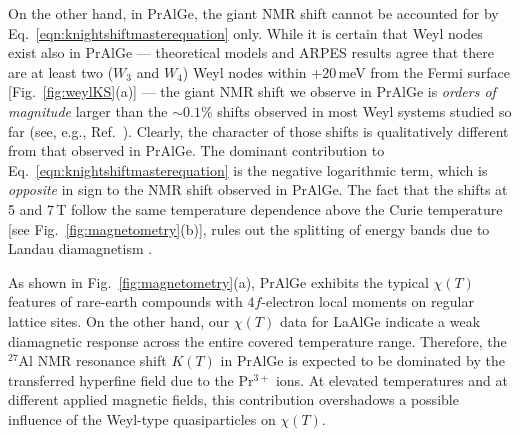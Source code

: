 \documentclass[aps,prb,a4paper,10pt,twocolumn,showpacs,floatfix,superscriptaddress,preprintnumbers,longbibliography]{revtex4-2}
\newcommand{\tcb}[1]{\textcolor{blue}{#1}}
\begin{document}

On the other hand, in PrAlGe, the giant NMR shift cannot be accounted for by Eq.~\eqref{eqn:knightshiftmasterequation} only. 
While it is certain that Weyl nodes exist also in PrAlGe --- theoretical models \cite{chang2018magnetic} and ARPES results %
\cite{sanchez2020observation} agree that there are at least two ($W_3$ and $W_4$) Weyl nodes within +20\,meV from the Fermi surface [Fig.~\ref{fig:weylKS}(a)] ---
the giant NMR shift we observe in PrAlGe is \emph{orders of magnitude}
larger than the $\sim 0.1\%$ shifts observed in most Weyl systems studied
so far (see, e.g., Ref.~\cite{antonenko2019nmr,Okvtovity2019nuclear,Wang2020landau}).
Clearly, the character of those shifts is qualitatively
different from that observed in PrAlGe. %
The dominant contribution to Eq.~\eqref{eqn:knightshiftmasterequation}
is the negative logarithmic term, which is \emph{opposite} in sign to
the NMR shift observed in PrAlGe. The fact that the shifts at 5 and 7\,T
follow the same temperature dependence above the Curie temperature
[see Fig.~\ref{fig:magnetometry}(b)], rules out the splitting of
energy bands due to Landau diamagnetism \cite{Wang2020landau}.

As shown in Fig.~\ref{fig:magnetometry}(a), PrAlGe exhibits the typical
$\chi(T)$ features of rare-earth compounds with $4f$-electron local
moments on regular lattice sites. On the other hand, our $\chi(T)$ data
for LaAlGe indicate a weak diamagnetic response across the entire
covered temperature range. %
Therefore, the $^{27}$Al NMR resonance shift $K(T)$ in PrAlGe is expected
to be dominated by the transferred hyperfine field
\cite{dunlap1972orbital,jones1969nuclear} due to %
the Pr$^{3+}$ ions. At elevated temperatures and at different applied
magnetic fields, this contribution overshadows %
a possible influence of the Weyl-type quasiparticles on $\chi(T)$.

\end{document}
